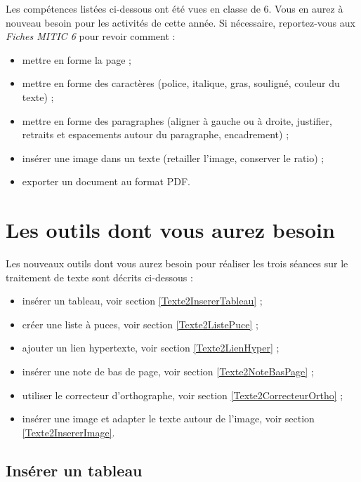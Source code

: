 Les compétences listées ci-dessous ont été vues en classe de 6. Vous en aurez à nouveau besoin pour les activités de cette année. Si nécessaire, reportez-vous aux \emph{Fiches MITIC 6} pour revoir comment :  

\begin{itemize}
\item mettre en forme la page ;
\item mettre en forme des caractères (police, italique, gras, souligné, couleur du texte) ;
\item mettre en forme des paragraphes (aligner à gauche ou à droite, justifier, retraits et espacements autour du paragraphe, encadrement) ;
\item insérer une image dans un texte (retailler l'image, conserver le ratio) ;
\item exporter un document au format PDF.
\end{itemize}



\section{Les outils dont vous aurez besoin}\label{Texte5eOutils}

Les nouveaux outils dont vous aurez besoin pour réaliser les trois séances sur le traitement de texte sont décrits ci-dessous :


\begin{itemize}   
\item insérer un tableau, voir section \vref{Texte2InsererTableau} ;
\item créer une liste à puces, voir section \vref{Texte2ListePuce} ;
\item ajouter un lien hypertexte, voir section \vref{Texte2LienHyper} ;
\item insérer une note de bas de page, voir section \vref{Texte2NoteBasPage} ;
\item utiliser le correcteur d'orthographe, voir section \vref{Texte2CorrecteurOrtho} ;
\item insérer une image et adapter le texte autour de l'image, voir section \vref{Texte2InsererImage}.
\end{itemize}  



\subsection{Insérer un tableau}\label{Texte2InsererTableau} 



